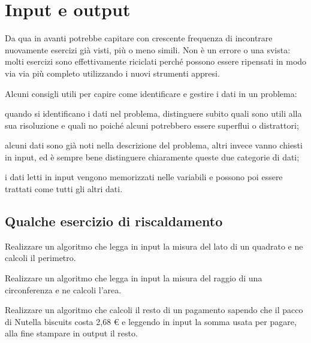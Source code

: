 \chapter{Input e output}

Da qua in avanti potrebbe capitare con crescente frequenza di incontrare nuovamente esercizi già visti, più o meno simili. Non è un errore o una svista: molti esercizi sono effettivamente riciclati perché possono essere ripensati in modo via via più completo utilizzando i nuovi strumenti appresi.

Alcuni consigli utili per capire come identificare e gestire i dati in un problema:

\begin{aenumerate}
	\item quando si identificano i dati nel problema, distinguere subito quali sono utili alla sua risoluzione e quali no poiché alcuni potrebbero essere superflui o distrattori;
	\item alcuni dati sono già noti nella descrizione del problema, altri invece vanno chiesti in input, ed è sempre bene distinguere chiaramente queste due categorie di dati;
	\item i dati letti in input vengono memorizzati nelle variabili e possono poi essere trattati come tutti gli altri dati.
\end{aenumerate}

\section{Qualche esercizio di riscaldamento}

\begin{exercise}
	Realizzare un algoritmo che legga in input la misura del lato di un quadrato e ne calcoli il perimetro.
\end{exercise}

\begin{exercise}
	Realizzare un algoritmo che legga in input la misura del raggio di una circonferenza e ne calcoli l'area.
\end{exercise}

\begin{exercise}
	Realizzare un algoritmo che calcoli il resto di un pagamento sapendo che il pacco di Nutella biscuits costa 2,68 € e leggendo in input la somma usata per pagare, alla fine stampare in output il resto.
\end{exercise}

